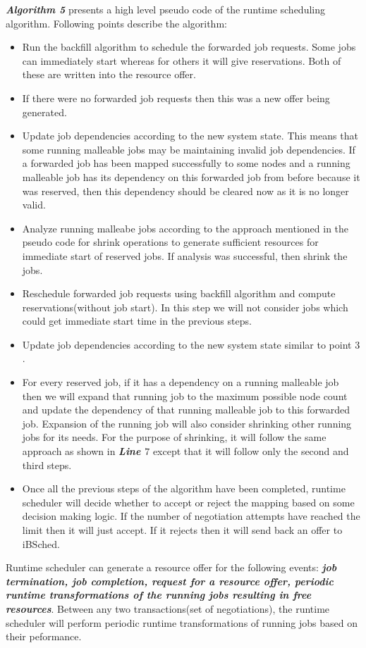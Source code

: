 \textbf{\textit{Algorithm 5}} presents a high level pseudo code of the runtime scheduling algorithm. Following points describe the algorithm:
\begin{itemize}
\item Run the backfill algorithm to schedule the forwarded job requests. Some jobs can immediately start whereas for others it will give reservations. Both of these are written into the resource offer.
\item If there were no forwarded job requests then this was a new offer being generated.
\item Update job dependencies according to the new system state. This means that some running malleable jobs may be maintaining invalid job dependencies. If a forwarded job has been mapped successfully to some nodes and a running malleable job has its dependency on this forwarded job from before because it was reserved, then this dependency should be cleared now as it is no longer valid.
\item Analyze running malleabe jobs according to the approach mentioned in the pseudo code for shrink operations to generate sufficient resources for immediate start of reserved jobs. If analysis was successful, then shrink the jobs.
\item Reschedule forwarded job requests using backfill algorithm and compute reservations(without job start). In this step we will not consider jobs which could get immediate start time in the previous steps.
\item Update job dependencies according to the new system state similar to point $3$.
\item For every reserved job, if it has a dependency on a running malleable job then we will expand that running job to the maximum possible node count and update the dependency of that running malleable job to this forwarded job. Expansion of the running job will also consider shrinking other running jobs for its needs. For the purpose of shrinking, it will follow the same approach as shown in \textbf{\textit{Line $7$}} except that it will follow only the second and third steps.
\item Once all the previous steps of the algorithm have been completed, runtime scheduler will decide whether to accept or reject the mapping based on some decision making logic. If the number of negotiation attempts have reached the limit then it will just accept. If it rejects then it will send back an offer to iBSched.
\end{itemize}
Runtime scheduler can generate a resource offer for the following events: \textbf{\textit{job termination, job completion, request for a resource offer, periodic runtime transformations of the running jobs resulting in free resources}}. Between any two transactions(set of negotiations), the runtime scheduler will perform periodic runtime transformations of running jobs based on their peformance.

